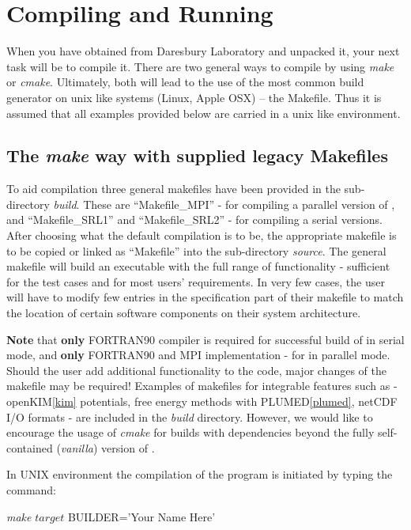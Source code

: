 \section{Compiling and Running \D}
\label{compilation}

When you have obtained \D from Daresbury Laboratory and unpacked it,
your next task will be to compile it.  There are two general ways to
compile \D by using {\sl make} or {\sl cmake}.  Ultimately, both will
lead to the use of the most common build generator on unix like systems
(Linux, Apple OSX) -- the Makefile.  Thus it is assumed that all
examples provided below are carried in a unix like environment.

\subsection{The {\sl make} way with supplied legacy Makefiles}
\label{make}

To aid compilation three general makefiles have been provided
in the sub-directory {\em build}.  These are ``Makefile\_MPI'' -
for compiling a parallel version of \D, and ``Makefile\_SRL1'' and
``Makefile\_SRL2'' - for compiling a serial versions.  After choosing
what the default compilation is to be, the appropriate makefile is
to be copied or linked as ``Makefile'' into the sub-directory
{\em source}.  The general \D makefile will build an executable with
the full range of functionality - sufficient for the test cases and
for most users' requirements.  In very few cases, the user will have
to modify few entries in the specification part of their makefile to
match the location of certain software components on their system architecture.

{\bf Note} that {\bf only} FORTRAN90 compiler is required for
successful build of \D in serial mode, and {\bf only}
FORTRAN90 and MPI implementation - for \D in
parallel mode.  Should the user add additional functionality to
the code, major changes of the makefile may be required!  Examples
of makefiles for integrable features such as - openKIM\ref{kim}
potentials, free energy methods with PLUMED\ref{plumed}, netCDF
I/O formats - are included in the {\em build} directory.  However,
we would like to encourage the usage of {\sl cmake} for builds
with dependencies beyond the fully self-contained ({\em vanilla})
version of \D.

In UNIX environment the compilation of the program is initiated by
typing the command:

{\sl make} $target$ BUILDER='Your Name Here'

